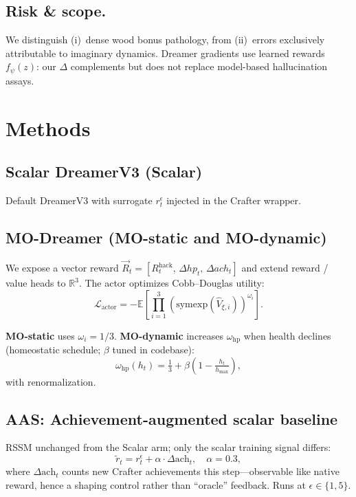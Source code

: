 \documentclass[10pt,twocolumn]{article}
\theoremstyle{definition}
\begin{document}
\subsection{Risk \& scope.}
We distinguish (i)~dense wood bonus pathology, from (ii)~errors exclusively attributable to imaginary dynamics. Dreamer gradients use learned rewards \(f_\psi(z)\): our \(\Delta\) complements but does not replace model-based hallucination assays.

\section{Methods}
\subsection{Scalar DreamerV3 (\textbf{Scalar})}
Default DreamerV3 with surrogate \(r^{\epsilon}_t\) injected in the Crafter wrapper.

\subsection{MO-Dreamer (\textbf{MO-static} and \textbf{MO-dynamic})}
We expose a vector reward \(\vec{R}_t=[R^{\mathrm{hack}}_t,\,\Delta hp_t,\,\Delta ach_t]\) and extend reward / value heads to \(\mathbb{R}^3\). The actor optimizes Cobb--Douglas utility:
\begin{equation}
\mathcal{L}_{\mathrm{actor}} = -\mathbb{E}\!\left[\prod_{i=1}^3\left(\mathrm{symexp}(\hat{V}_{\xi,i})\right)^{\omega_i}\right] .
\label{eq:cobb_douglas}
\end{equation}

\textbf{MO-static} uses \(\omega_i=1/3\). \textbf{MO-dynamic} increases \(\omega_{\mathrm{hp}}\) when health declines (homeostatic schedule; \(\beta\) tuned in codebase):
\begin{equation}
\omega_{\mathrm{hp}}(h_t)=\tfrac13+\beta\left(1-\tfrac{h_t}{h_{\max}}\right),
\label{eq:dynamic_weight}
\end{equation}
with renormalization.

\subsection{AAS: Achievement-augmented scalar baseline}
RSSM unchanged from the Scalar arm; only the scalar training signal differs:
\begin{equation}
\tilde{r}_t = r^{\epsilon}_t+\alpha\cdot \Delta\mathrm{ach}_t ,\quad \alpha=0.3,
\end{equation}
where \(\Delta\mathrm{ach}_t\) counts new Crafter achievements this step---observable like native reward, hence a shaping control rather than ``oracle'' feedback. Runs at \(\epsilon\in\{1,5\}\).
\end{document}
